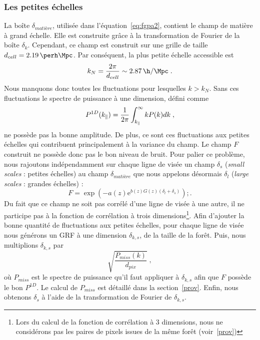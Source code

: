 \documentclass[11pt, twoside, a4paper, openright]{report}
\begin{document}
\subsubsection{Les petites échelles}
La boîte $\delta_{matière}$, utilisée dans l'équation~\ref{eq:fgpa2}, contient le champ de matière à grand échelle. Elle est construite grâce à la transformation de Fourier de la boîte $\delta_k$.
Cependant, ce champ est construit sur une grille de taille $d_{cell} = \SI{2.19}{\perh\Mpc}$. Par conséquent, la plus petite échelle accessible est
\begin{equation}
  k_N = \frac{2 \pi}{d_{cell}} \sim \SI{2.87}{\h\per\Mpc} \; .
\end{equation}
  Nous manquons donc toutes les fluctuations pour lesquelles $k > k_N$. Sans ces fluctuations le spectre de puissance à une dimension, défini comme
\begin{equation}
  \label{eq:p1d}
  P^{1D}(k_{\parallel}{}) = \frac{1}{2 \pi} \int_{k_{\parallel}{}}^{\infty} k P(k) dk \; ,
\end{equation}
ne possède pas la bonne amplitude. De plus, ce sont ces fluctuations aux petites échelles qui contribuent principalement à la variance du champ. Le champ $F$ construit ne possède donc pas le bon niveau de bruit.
Pour palier ce problème, nous rajoutons indépendamment sur chaque ligne de visée un champ $\delta_s$ (\emph{small scales} : petites échelles) au champ $\delta_{matière}$ que nous appelons désormais $\delta_{l}$ (\emph{large scales} : grandes échelles) :
\begin{equation}
  \label{eq:fgpa3}
  F = \exp( - a(z) \mathrm{e}^{b(z) G(z) (\delta_l + \delta_s)}) ;.
\end{equation}
Du fait que ce champ ne soit pas corrélé d'une ligne de visée à une autre, il ne participe pas à la fonction de corrélation à trois dimensions\footnote{Lors du calcul de la fonction de corrélation à 3 dimensions, nous ne considérons pas les paires de pixels issues de la même forêt (voir~\ref{prov})}. Afin d'ajouter la bonne quantité de fluctuations aux petites échelles, pour chaque ligne de visée nous générons un GRF à une dimension $\delta_{k,s}$, de la taille de la forêt. Puis, nous multiplions $\delta_{k,s}$ par
\begin{equation}
  \sqrt{\frac{P_{miss}(k)}{d_{pix}}} \; ,
\end{equation}
où $P_{miss}$ est le spectre de puissance qu'il faut appliquer à $\delta_{k,s}$ afin que $F$ possède le bon $P^{1D}$. Le calcul de $P_{miss}$ est détaillé dans la section~\ref{prov}. Enfin, nous obtenons $\delta_s$ à l'aide de la transformation de Fourier de $\delta_{k,s}$.
\end{document}
